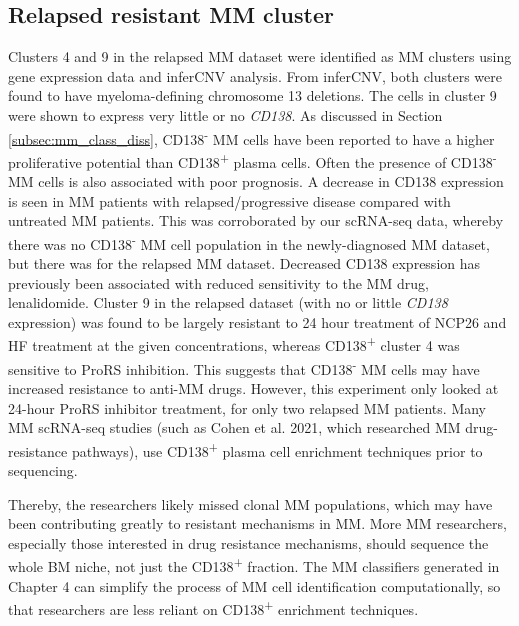 \subsection{Relapsed resistant MM cluster}

Clusters 4 and 9 in the relapsed MM dataset were identified as MM clusters using gene expression data and inferCNV analysis.
From inferCNV, both clusters were found to have myeloma-defining chromosome 13 deletions.
The cells in cluster 9 were shown to express very little or no \textit{CD138}.
As discussed in Section \ref{subsec:mm_class_diss}, CD138\textsuperscript{-} MM cells have been reported to have a higher proliferative potential than CD138\textsuperscript{+} plasma cells.
Often the presence of CD138\textsuperscript{-} MM cells is also associated with poor prognosis.
A decrease in CD138 expression is seen in MM patients with relapsed/progressive disease compared with untreated MM patients\cite{kawano2012multiple}.
This was corroborated by our scRNA-seq data, whereby there was no CD138\textsuperscript{-} MM cell population in the newly-diagnosed MM dataset, but there was for the relapsed MM dataset.
Decreased CD138 expression has previously been associated with reduced sensitivity to the MM drug, lenalidomide\cite{kawano2012multiple}.
Cluster 9 in the relapsed dataset (with no or little \textit{CD138} expression) was found to be largely resistant to 24 hour treatment of NCP26 and HF treatment at the given concentrations, whereas CD138\textsuperscript{+} cluster 4 was sensitive to ProRS inhibition.
This suggests that CD138\textsuperscript{-} MM cells may have increased resistance to anti-MM drugs.
However, this experiment only looked at 24-hour ProRS inhibitor treatment, for only two relapsed MM patients.
Many MM scRNA-seq studies (such as Cohen et al. 2021, which researched MM drug-resistance pathways\cite{cohen2021identification}), use CD138\textsuperscript{+} plasma cell enrichment techniques prior to sequencing.

Thereby, the researchers likely missed clonal MM populations, which may have been contributing greatly to resistant mechanisms in MM\@.
More MM researchers, especially those interested in drug resistance mechanisms, should sequence the whole BM niche, not just the CD138\textsuperscript{+} fraction.
The MM classifiers generated in Chapter 4 can simplify the process of MM cell identification computationally, so that researchers are less reliant on CD138\textsuperscript{+} enrichment techniques.

